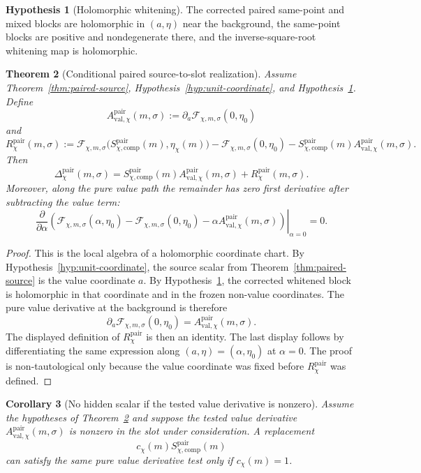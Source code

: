 \documentclass[11pt,a4paper]{amsart}
\theoremstyle{plain}
\newtheorem{theorem}{Theorem}[section]
\newtheorem{corollary}[theorem]{Corollary}
\theoremstyle{definition}
\newtheorem{hypothesis}[theorem]{Hypothesis}
\newcommand{\pair}{\mathrm{pair}}
\newcommand{\comp}{\mathrm{comp}}
\newcommand{\val}{\mathrm{val}}
\newcommand{\calF}{\mathcal F}
\begin{document}
\begin{hypothesis}[Holomorphic whitening]
\label{hyp:whitening}
The corrected paired same-point and mixed blocks are holomorphic in
\((a,\eta)\) near the background, the same-point blocks are positive and
nondegenerate there, and the inverse-square-root whitening map is holomorphic.
\end{hypothesis}

\begin{theorem}[Conditional paired source-to-slot realization]
\label{thm:conditional-slot}
Assume Theorem~\ref{thm:paired-source},
Hypothesis~\ref{hyp:unit-coordinate}, and
Hypothesis~\ref{hyp:whitening}.  Define
\[
  A_{\val,\chi}^{\pair}(m,\sigma)
  :=
  \partial_a\calF_{\chi,m,\sigma}(0,\eta_0)
\]
and
\[
  R_\chi^{\pair}(m,\sigma)
  :=
  \calF_{\chi,m,\sigma}
  \bigl(S_{\chi,\comp}^{\pair}(m),\eta_\chi(m)\bigr)
  -
  \calF_{\chi,m,\sigma}(0,\eta_0)
  -
  S_{\chi,\comp}^{\pair}(m)
  A_{\val,\chi}^{\pair}(m,\sigma).
\]
Then
\[
  \Delta_\chi^{\pair}(m,\sigma)
  =
  S_{\chi,\comp}^{\pair}(m)
  A_{\val,\chi}^{\pair}(m,\sigma)
  +
  R_\chi^{\pair}(m,\sigma).
\]
Moreover, along the pure value path the remainder has zero first derivative
after subtracting the value term:
\[
  \left.
  \frac{\partial}{\partial \alpha}
  \left(
    \calF_{\chi,m,\sigma}(\alpha,\eta_0)
    -
    \calF_{\chi,m,\sigma}(0,\eta_0)
    -
    \alpha A_{\val,\chi}^{\pair}(m,\sigma)
  \right)
  \right|_{\alpha=0}
  =
  0.
\]
\end{theorem}

\begin{proof}
This is the local algebra of a holomorphic coordinate chart.  By
Hypothesis~\ref{hyp:unit-coordinate}, the source scalar from
Theorem~\ref{thm:paired-source} is the value coordinate \(a\).  By
Hypothesis~\ref{hyp:whitening}, the corrected whitened block is holomorphic in
that coordinate and in the frozen non-value coordinates.  The pure value
derivative at the background is therefore
\[
  \partial_a\calF_{\chi,m,\sigma}(0,\eta_0)
  =
  A_{\val,\chi}^{\pair}(m,\sigma).
\]
The displayed definition of \(R_\chi^{\pair}\) is then an identity.  The last
display follows by differentiating the same expression along
\((a,\eta)=(\alpha,\eta_0)\) at \(\alpha=0\).  The proof is non-tautological
only because the value coordinate was fixed before \(R_\chi^{\pair}\) was
defined.
\end{proof}

\begin{corollary}[No hidden scalar if the tested value derivative is nonzero]
\label{cor:no-hidden-scalar}
Assume the hypotheses of Theorem~\ref{thm:conditional-slot} and suppose the
tested value derivative \(A_{\val,\chi}^{\pair}(m,\sigma)\) is nonzero in the
slot under consideration.  A replacement
\[
  c_\chi(m)S_{\chi,\comp}^{\pair}(m)
\]
can satisfy the same pure value derivative test only if \(c_\chi(m)=1\).
\end{corollary}
\end{document}
